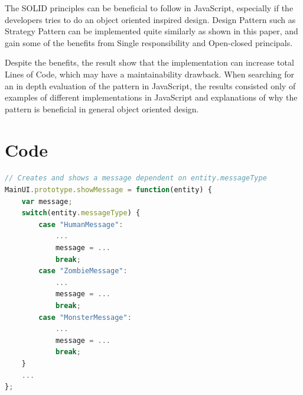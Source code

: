 \documentclass[conference, a4paper]{IEEEtran}
\begin{document}
The SOLID principles can be beneficial to follow in JavaScript, especially if the developers tries to do an object oriented inspired design. Design Pattern such as Strategy Pattern can be implemented quite similarly as shown in this paper, and gain some of the benefits from Single responsibility and Open-closed principals.

Despite the benefits, the result show that the implementation can increase total Lines of Code, which may have a maintainability drawback. When searching for an in depth evaluation of the pattern in JavaScript, the results consisted only of examples of different implementations in JavaScript and explanations of why the pattern is beneficial in general object oriented design.

\clearpage
\section*{Code}

\begin{lstlisting}[language=JavaScript, label=lst:switch-case, caption=\texttt{MainUI.js} The original switch statement.]
// Creates and shows a message dependent on entity.messageType
MainUI.prototype.showMessage = function(entity) {
	var message;
	switch(entity.messageType) {
		case "HumanMessage":
			...
			message = ...
			break;
		case "ZombieMessage":
			...
			message = ...
			break;
		case "MonsterMessage":
			...
			message = ...
			break;
	}
	...
};
\end{lstlisting}
\end{document}
